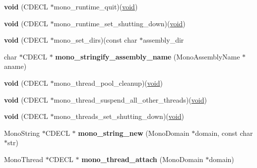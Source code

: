 \begin{DoxyCompactItemize}
\item 
\mbox{\label{structloaded__mono_ae00eaaaaa25bb260269f83dfefc4a37c}} 
{\bfseries void} (C\+D\+E\+CL $\ast$mono\+\_\+runtime\+\_\+quit)(\hyperlink{interfacevoid}{void})
\item 
\mbox{\label{structloaded__mono_acbb3564b72d2f61944a15dafc10cee79}} 
{\bfseries void} (C\+D\+E\+CL $\ast$mono\+\_\+runtime\+\_\+set\+\_\+shutting\+\_\+down)(\hyperlink{interfacevoid}{void})
\item 
\mbox{\label{structloaded__mono_a798fd0ad3401d3e7e689dfea2fcb1f04}} 
{\bfseries void} (C\+D\+E\+CL $\ast$mono\+\_\+set\+\_\+dirs)(const char $\ast$assembly\+\_\+dir
\item 
\mbox{\label{structloaded__mono_a52295ed079ec6c11a89a7b5dacef1ea0}} 
char $\ast$C\+D\+E\+CL $\ast$ {\bfseries mono\+\_\+stringify\+\_\+assembly\+\_\+name} (Mono\+Assembly\+Name $\ast$aname)
\item 
\mbox{\label{structloaded__mono_a6fe462c6a58b418570dbd2a7c3434b28}} 
{\bfseries void} (C\+D\+E\+CL $\ast$mono\+\_\+thread\+\_\+pool\+\_\+cleanup)(\hyperlink{interfacevoid}{void})
\item 
\mbox{\label{structloaded__mono_a530cd618b8c7429d7cd67dbae0eab0b9}} 
{\bfseries void} (C\+D\+E\+CL $\ast$mono\+\_\+thread\+\_\+suspend\+\_\+all\+\_\+other\+\_\+threads)(\hyperlink{interfacevoid}{void})
\item 
\mbox{\label{structloaded__mono_a0c0ebe6eb401544be73d54c8be7c38f7}} 
{\bfseries void} (C\+D\+E\+CL $\ast$mono\+\_\+threads\+\_\+set\+\_\+shutting\+\_\+down)(\hyperlink{interfacevoid}{void})
\item 
\mbox{\label{structloaded__mono_aac37c977c449c272f4beb886e2e2a0db}} 
Mono\+String $\ast$C\+D\+E\+CL $\ast$ {\bfseries mono\+\_\+string\+\_\+new} (Mono\+Domain $\ast$domain, const char $\ast$str)
\item 
\mbox{\label{structloaded__mono_a1e5f635b63535bc1b08203c6f988fc53}} 
Mono\+Thread $\ast$C\+D\+E\+CL $\ast$ {\bfseries mono\+\_\+thread\+\_\+attach} (Mono\+Domain $\ast$domain)
\end{DoxyCompactItemize}
